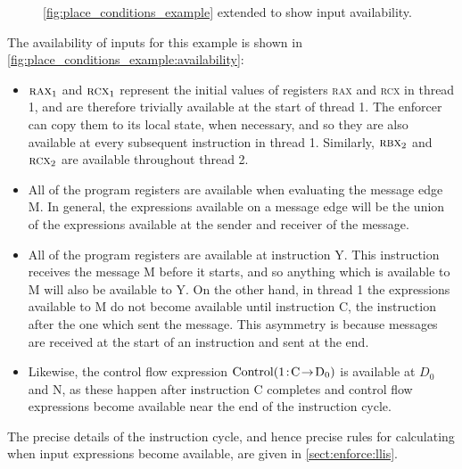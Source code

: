 \begin{figure}[t]
  \vspace{-12pt}
  \caption{\autoref{fig:place_conditions_example} extended to show
    input availability.}
  \label{fig:place_conditions_example:availability}
\end{figure}

The availability of inputs for this example is shown in
\autoref{fig:place_conditions_example:availability}:
\begin{itemize}
\item $\textsc{rax}_1$ and $\textsc{rcx}_1$ represent the initial
  values of registers \textsc{rax} and \textsc{rcx} in thread 1, and
  are therefore trivially available at the start of thread 1.  The
  enforcer can copy them to its local state, when necessary, and so
  they are also available at every subsequent instruction in thread 1.
  Similarly, $\textsc{rbx}_2$ and $\textsc{rcx}_2$ are available
  throughout thread 2.
\item All of the program registers are available when evaluating the
  message edge M.  In general, the expressions available on a message
  edge will be the union of the expressions available at the sender and
  receiver of the message.
\item All of the program registers are available at instruction Y.
  This instruction receives the message M before it starts, and so
  anything which is available to M will also be available to Y.  On
  the other hand, in thread 1 the expressions available to M do not
  become available until instruction C, the instruction after the one
  which sent the message.  This asymmetry is because messages are
  received at the start of an instruction and sent at the end.
\item Likewise, the control flow expression $\mathrm{Control}(\mathrm{1}\!:\!\mathrm{C}\!\rightarrow\!\mathrm{D_0})$
  is available at $D_0$ and N, as these happen after instruction C
  completes and control flow expressions become available near the end
  of the instruction cycle.
\end{itemize}
The precise details of the instruction cycle, and hence precise rules
for calculating when input expressions become available, are given in
\autoref{sect:enforce:llis}.

